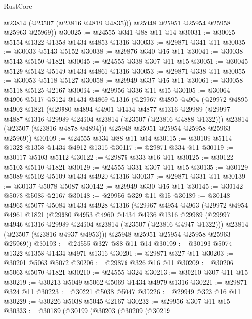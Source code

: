 \begin{lexlean}{RustCore}
\begin{coremodule}
          @23814
          (@23507 (@23816 @4819 @4835)))
        @25948
        @25951
        @25954
        @25958
        @25963
        @25969))
@30025 := @24555 @341 @88 @11 @14
@30031 := @30025 @5154 @1322 @1358 @1434 @4853 @1316
@30033 := @29871 @341 @11
@30035 := @30033 @5143 @5152
@30038 := @29876 @340 @16 @11
@30041 := @30038 @5143 @5150 @1821
@30045 := @24555 @338 @307 @11 @15
@30051 := @30045 @5129 @5142 @5149 @1434 @4861 @1316
@30053 := @29871 @338 @11
@30055 := @30053 @5118 @5127
@30058 := @29949 @337 @16 @11
@30061 := @30058 @5118 @5125 @2167
@30064 := @29956 @336 @11 @15
@30105 := @30064
    @4906
    @5117
    @5124
    @1434
    @4869
    @1316
    (@29967
      @4895
      @4904
      (@29972
        @4895
        @4902
        @1821
        (@29980
          @4894
          @4901
          @1434
          @4877
          @1316
          @29989
          (@29997 @4887 @1316 @29989 @24604 @23814 (@23507 (@23816 @4888 @1322)))
          @23814
          (@23507 (@23816 @4878 @4894)))
        @25948
        @25951
        @25954
        @25958
        @25963
        @25969))
@30109 := @24555 @334 @88 @11 @14
@30115 := @30109 @5114 @1322 @1358 @1434 @4912 @1316
@30117 := @29871 @334 @11
@30119 := @30117 @5103 @5112
@30122 := @29876 @333 @16 @11
@30125 := @30122 @5103 @5110 @1821
@30129 := @24555 @331 @307 @11 @15
@30135 := @30129 @5089 @5102 @5109 @1434 @4920 @1316
@30137 := @29871 @331 @11
@30139 := @30137 @5078 @5087
@30142 := @29949 @330 @16 @11
@30145 := @30142 @5078 @5085 @2167
@30148 := @29956 @329 @11 @15
@30189 := @30148
    @4965
    @5077
    @5084
    @1434
    @4928
    @1316
    (@29967
      @4954
      @4963
      (@29972
        @4954
        @4961
        @1821
        (@29980
          @4953
          @4960
          @1434
          @4936
          @1316
          @29989
          (@29997 @4946 @1316 @29989 @24604 @23814 (@23507 (@23816 @4947 @1322)))
          @23814
          (@23507 (@23816 @4937 @4953)))
        @25948
        @25951
        @25954
        @25958
        @25963
        @25969))
@30193 := @24555 @327 @88 @11 @14
@30199 := @30193 @5074 @1322 @1358 @1434 @4971 @1316
@30201 := @29871 @327 @11
@30203 := @30201 @5063 @5072
@30206 := @29876 @326 @16 @11
@30209 := @30206 @5063 @5070 @1821
@30210 := @24555 @324
@30213 := @30210 @307 @11 @15
@30219 := @30213 @5049 @5062 @5069 @1434 @4979 @1316
@30221 := @29871 @324 @11
@30223 := @30221 @5038 @5047
@30226 := @29949 @323 @16 @11
@30229 := @30226 @5038 @5045 @2167
@30232 := @29956 @307 @11 @15
@30333 := @30189
    (@30199
      (@30203
        (@30209
          (@30219

\end{coremodule}
\end{lexlean}
